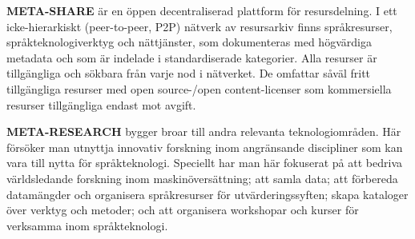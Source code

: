 \begin{multicols}{2}
\textbf{META-SHARE} är en öppen decentraliserad plattform för
resursdelning. I ett icke-hierarkiskt (peer-to-peer, P2P) nätverk av
resursarkiv finns språkresurser, språkteknologiverktyg och
nättjänster, som dokumenteras med högvärdiga metadata och som är
indelade i standardiserade kategorier. Alla resurser är tillgängliga
och sökbara från varje nod i nätverket. De omfattar såväl fritt
tillgängliga resurser med open source-/open content-licenser som
kommersiella resurser tillgängliga endast mot avgift. 

\textbf{META-RESEARCH} bygger broar till andra relevanta
teknologiområden. Här försöker man utnyttja innovativ forskning inom
angränsande discipliner som kan vara till nytta för
språkteknologi. Speciellt har man här fokuserat på 
att bedriva världsledande forskning inom maskinöversättning; att samla data; att förbereda datamängder och organisera språkresurser för utvärderingssyften; skapa kataloger över verktyg och metoder; och att organisera workshopar och kurser för verksamma inom språkteknologi.

\end{multicols}

\setcounter{section}{0}
\setcounter{figure}{0}
\cleardoublepage


\nonfrenchspacing
{}

